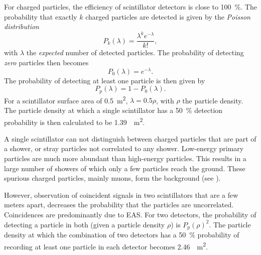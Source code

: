 For charged particles, the efficiency of scintillator detectors is close to
\SI{100}{\percent}.
The probability that exactly $k$ charged particles are detected is given by the
\emph{Poisson distribution}
\begin{equation}
P_k(\lambda) = \frac{\lambda^k e^{-\lambda}}{k!},
\end{equation}
with $\lambda$ the \emph{expected} number of detected particles. The probability
of detecting \emph{zero} particles then becomes
\begin{equation}
P_0(\lambda) = e^{-\lambda}.
\end{equation}
The probability of detecting at least one particle
is then given by
\begin{equation}
P_p(\lambda) = 1 - P_0(\lambda).
\end{equation}
For a scintillator surface area of \SI{0.5}{\square\meter}, $\lambda = \num{0.5}
\rho$, with $\rho$ the particle density. The
particle density at which a single scintillator has a \SI{50}{\percent}
detection probability is then calculated to be
\SI{1.39}{\per\square\meter}.

A single scintillator can not distinguish between charged particles that are
part of a shower, or stray particles not correlated to any shower.  Low-energy
primary particles are much more abundant than high-energy particles.  This
results in a large number of showers of which only a few particles reach the
ground. These spurious charged particles, mainly muons, form the background (see
).

However, observation of coincident signals in two scintillators that are a few
meters apart, decreases the probability that the particles are uncorrelated.
Coincidences are predominantly due to EAS.  For two detectors, the probability
of detecting a particle in both (given a particle density $\rho$) is
$P_p(\rho)^2$.  The particle density at which the combination of two detectors
has a \SI{50}{\percent} probability of recording at least one particle in each
detector becomes \SI{2.46}{\per\square\meter}.


